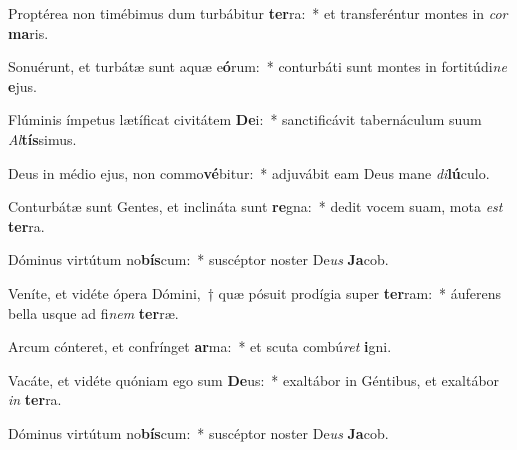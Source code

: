 \item Proptérea non timébimus dum turbábitur \textbf{ter}ra:~* et transferéntur montes in \textit{cor} \textbf{ma}ris.
\item Sonuérunt, et turbátæ sunt aquæ e\textbf{ó}rum:~* conturbáti sunt montes in fortitúdi\textit{ne} \textbf{e}jus.
\item Flúminis ímpetus lætíficat civitátem \textbf{De}i:~* sanctificávit tabernáculum suum \textit{Al}\textbf{tís}simus.
\item Deus in médio ejus, non commo\textbf{vé}bitur:~* adjuvábit eam Deus mane \textit{di}\textbf{lú}culo.
\item Conturbátæ sunt Gentes, et inclináta sunt \textbf{re}gna:~* dedit vocem suam, mota \textit{est} \textbf{ter}ra.
\item Dóminus virtútum no\textbf{bís}cum:~* suscéptor noster De\textit{us} \textbf{Ja}cob.
\item Veníte, et vidéte ópera Dómini,~† quæ pósuit prodígia super \textbf{ter}ram:~* áuferens bella usque ad fi\textit{nem} \textbf{ter}ræ.
\item Arcum cónteret, et confrínget \textbf{ar}ma:~* et scuta combú\textit{ret} \textbf{i}gni.
\item Vacáte, et vidéte quóniam ego sum \textbf{De}us:~* exaltábor in Géntibus, et exaltábor \textit{in} \textbf{ter}ra.
\item Dóminus virtútum no\textbf{bís}cum:~* suscéptor noster De\textit{us} \textbf{Ja}cob.
